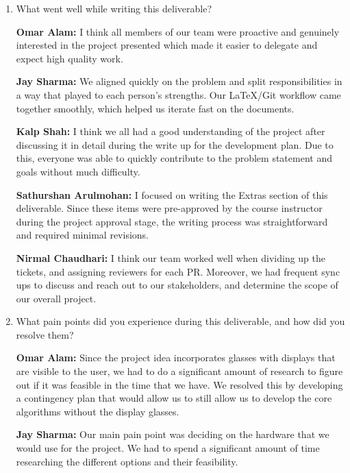 \documentclass{article}
\begin{document}


\begin{enumerate}
    \item What went well while writing this deliverable? 
    
    \textbf{Omar Alam:} I think all members of our team were proactive and
    genuinely interested in the project presented which made it easier to
    delegate and expect high quality work. 
    
    \textbf{Jay Sharma:} We aligned quickly on the problem and split
    responsibilities in a way that played to each person's strengths. Our
    LaTeX/Git workflow came together smoothly, which helped us iterate fast on
    the documents.

    \textbf{Kalp Shah:} I think we all had a good understanding of the project
    after discussing it in detail during the write up for the development plan.
    Due to this, everyone was able to quickly contribute to the problem
    statement and goals without much difficulty.

    \textbf{Sathurshan Arulmohan:} I focused on writing the Extras section of
    this deliverable. Since these items were pre-approved by the course
    instructor during the project approval stage, the writing process was
    straightforward and required minimal revisions.

    \textbf{Nirmal Chaudhari:} I think our team worked well when dividing up the
    tickets, and assigning reviewers for each PR. Moreover, we had frequent sync
    ups to discuss and reach out to our stakeholders, and determine the scope of
    our overall project. 

    \item What pain points did you experience during this deliverable, and how
    did you resolve them?

    \textbf{Omar Alam:} Since the project idea incorporates glasses with
    displays that are visible to the user, we had to do a significant amount of
    research to figure out if it was feasible in the time that we have. We
    resolved this by developing a contingency plan that would allow us to still
    allow us to develop the core algorithms without the display glasses.

    \textbf{Jay Sharma:} Our main pain point was deciding on the hardware that
     we would use for the project. We had to spend a significant amount of time
     researching the different options and their feasibility.
    

\end{enumerate}
\end{document}
